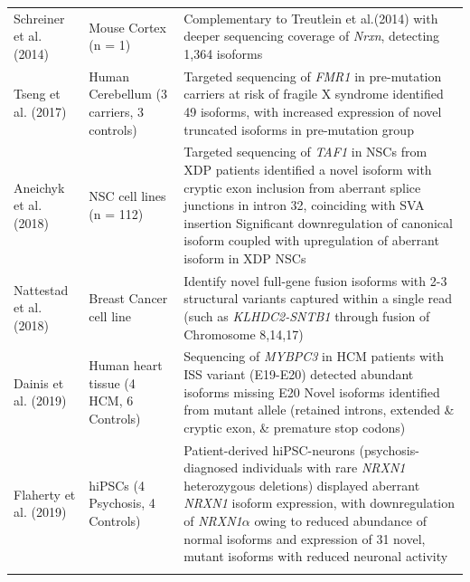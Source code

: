 \begin{landscape}
\begin{longtable}[c]{p{4cm}p{4cm}p{18cm}}
		\centering Schreiner et al. (2014)\cite{Schreiner2014} &
		\centering Mouse Cortex (n = 1) &
		\tabitem Complementary to Treutlein et al.(2014) with deeper sequencing coverage of \textit{Nrxn}, detecting 1,364 isoforms\\
		\hdashline[0.5pt/5pt]
		
		\centering Tseng et al. (2017) \cite{Tseng2017} &
		\centering Human Cerebellum \newline (3 carriers, 3 controls)  &
		\tabitem Targeted sequencing of \textit{FMR1} in pre-mutation carriers at risk of fragile X syndrome identified 49 isoforms, with increased expression of novel truncated isoforms in pre-mutation group \\
		\hdashline[0.5pt/5pt]	
		
		\centering Aneichyk et al. (2018) \cite{Aneichyk2018} &
		\centering NSC cell lines (n = 112)  &
		\tabitem Targeted sequencing of \textit{TAF1} in NSCs from XDP patients identified a novel isoform with cryptic exon inclusion from aberrant splice junctions in intron 32, coinciding with SVA insertion \newline
		\tabitem Significant downregulation of canonical isoform coupled with upregulation of aberrant isoform in XDP NSCs\\
		\hdashline[0.5pt/5pt]	
		
		\centering Nattestad et al. (2018) \cite{Nattestad2018} &
		\centering Breast Cancer cell line  &
		\tabitem Identify novel full-gene fusion isoforms with 2-3 structural variants captured within a single read (such as \textit{KLHDC2-SNTB1} through fusion of Chromosome 8,14,17) \\			
		
		\centering Dainis et al. (2019) \cite{Dainis2019} &
		\centering Human heart tissue (4 HCM, 6 Controls) &
		\tabitem Sequencing of \textit{MYBPC3} in HCM patients with ISS variant (E19-E20) detected abundant isoforms missing E20 \newline
		\tabitem Novel isoforms identified from mutant allele (retained introns, extended \& cryptic exon, \& premature stop codons)  \\
		
		\centering Flaherty et al. (2019) \cite{Flaherty2019} &
		\centering hiPSCs \newline (4 Psychosis, 4 Controls)  &
		\tabitem Patient-derived hiPSC-neurons (psychosis-diagnosed individuals with rare \textit{NRXN1} heterozygous deletions) displayed aberrant \textit{NRXN1} isoform expression, with downregulation of \textit{NRXN1$\alpha$} owing to reduced abundance of normal isoforms and expression of 31 novel, mutant isoforms with reduced neuronal activity  \\
		\hdashline[0.5pt/5pt]
		

\end{longtable}
\end{landscape}
